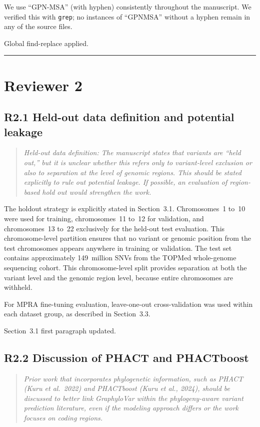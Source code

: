 \documentclass[11pt]{article}
\begin{document}
We use ``GPN-MSA'' (with hyphen) consistently throughout the manuscript.
We verified this with \texttt{grep}; no instances of ``GPNMSA'' without
a hyphen remain in any of the source files.

Global find-replace applied.

\bigskip
\hrule
\section*{Reviewer 2}

\subsection*{R2.1 Held-out data definition and potential leakage}

\begin{quote}
\itshape
Held-out data definition: The manuscript states that variants are
``held out,'' but it is unclear whether this refers only to
variant-level exclusion or also to separation at the level of genomic
regions.  This should be stated explicitly to rule out potential
leakage.  If possible, an evaluation of region-based hold out would
strengthen the work.
\end{quote}

The holdout strategy is explicitly stated in Section~3.1.  Chromosomes~1
to~10 were used for training, chromosomes~11 to~12 for validation, and
chromosomes~13 to~22 exclusively for the held-out test evaluation.  This
chromosome-level partition ensures that no variant or genomic position
from the test chromosomes appears anywhere in training or validation.  The
test set contains approximately 149~million SNVs from the TOPMed
whole-genome sequencing cohort.  This chromosome-level split provides
separation at both the variant level and the genomic region level, because
entire chromosomes are withheld.

For MPRA fine-tuning evaluation, leave-one-out cross-validation was used
within each dataset group, as described in Section~3.3.

Section~3.1 first paragraph updated.

\bigskip

\subsection*{R2.2 Discussion of PHACT and PHACTboost}

\begin{quote}
\itshape
Prior work that incorporates phylogenetic information, such as PHACT
(Kuru et al.\ 2022) and PHACTboost (Kuru et al., 2024), should be
discussed to better link GraphyloVar within the phylogeny-aware variant
prediction literature, even if the modeling approach differs or the
work focuses on coding regions.
\end{quote}
\end{document}
